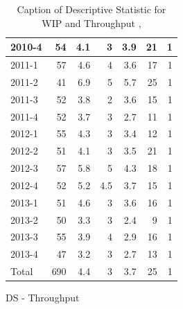 \documentclass[UKenglish]{ifimaster}  %
\begin{document}
\begin{appendices}
\begin{table}[!htbp]
\begin{adjustwidth}{-2.5cm}{}
\begin{subfigure}[b]{0.3\textwidth}
{\begin{tabular}{ | l | r | r | r | r | r | r | }
 2010-4  & 54 & 4.1 & 3 & 3.9 & 21 & 1 \\ \hline
 2011-1  & 57 & 4.6 & 4 & 3.6 & 17 & 1 \\ \hline
 2011-2  & 41 & 6.9 & 5 & 5.7 & 25 & 1 \\ \hline
 2011-3  & 52 & 3.8 & 2 & 3.6 & 15 & 1 \\ \hline
 2011-4  & 52 & 3.7 & 3 & 2.7 & 11 & 1 \\ \hline
 2012-1  & 55 & 4.3 & 3 & 3.4 & 12 & 1 \\ \hline
 2012-2  & 51 & 4.1 & 3 & 3.5 & 21 & 1 \\ \hline
 2012-3  & 57 & 5.8 & 5 & 4.3 & 18 & 1 \\ \hline
 2012-4  & 52 & 5.2 & 4.5 & 3.7 & 15 & 1 \\ \hline
 2013-1  & 51 & 4.6 & 3 & 3.6 & 16 & 1 \\ \hline
 2013-2  & 50 & 3.3 & 3 & 2.4 & 9 & 1 \\ \hline
 2013-3  & 55 & 3.9 & 4 & 2.9 & 16 & 1 \\ \hline
 2013-4  & 47 & 3.2 & 3 & 2.7 & 13 & 1 \\ \hline
 Total & 690 & 4.4 & 3 & 3.7 & 25 & 1 \\ \hline

\end{tabular}
}
\caption{DS - Throughput}
 \label{DS:Throughput:2}
\end{subfigure}
\end{adjustwidth}
\caption[Optional caption for list of figures]{Caption of Descriptive Statistic for WIP and Throughput  , }
\label{DS:2:1} %
\end{table}




\end{appendices}
\end{document}
